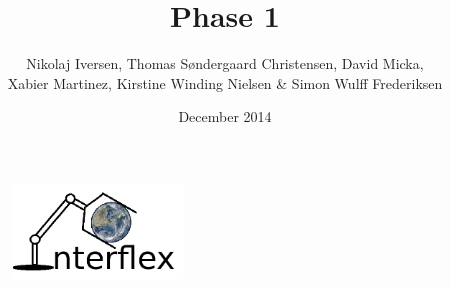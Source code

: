 \begin{titlepage}


\title{Phase 1}
\author{Nikolaj Iversen, Thomas Søndergaard Christensen, David Micka,\\ Xabier Martinez, Kirstine Winding Nielsen \& Simon Wulff Frederiksen}
\date{December 2014}

\begin{figure}[b]
\centering
\includegraphics[width=0.4\textwidth]{graphics/logo}
\end{figure}

\vfill
\end{titlepage}
\maketitle

